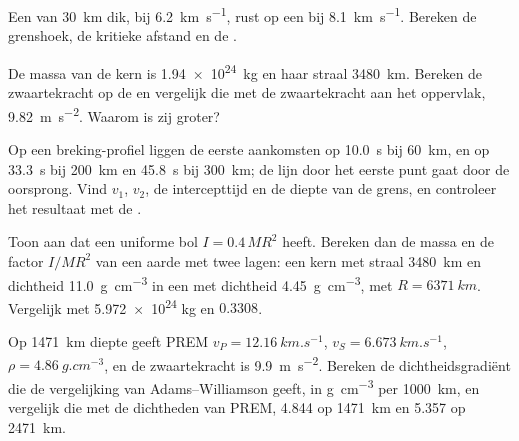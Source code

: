 \begin{exercise}[$\star$]\label{exo:b1:layered-earth:3}
Een  van \qty{30}{km} dik, bij \qty{6.2}{km.s^{-1}}, rust op een  bij \qty{8.1}{km.s^{-1}}. Bereken de grenshoek, de kritieke afstand en de .
\end{exercise}

\begin{exercise}[$\star$]\label{exo:b1:layered-earth:4}
De massa van de kern is \qty{1.94e24}{kg} en haar straal \qty{3480}{km}. Bereken de zwaartekracht op de  en vergelijk die met de
zwaartekracht aan het oppervlak, \qty{9.82}{m.s^{-2}}. Waarom is zij groter?
\end{exercise}

\begin{exercise}[$\star\star$]\label{exo:b1:layered-earth:5}
Op een breking-profiel liggen de eerste aankomsten op \qty{10.0}{s} bij \qty{60}{km}, en op \qty{33.3}{s} bij \qty{200}{km} en \qty{45.8}{s} bij
\qty{300}{km}; de lijn door het eerste punt gaat door de oorsprong. Vind $v_1$, $v_2$, de intercepttijd en de diepte van de grens, en controleer het
resultaat met de .
\end{exercise}

\begin{exercise}[$\star\star$]\label{exo:b1:layered-earth:6}
Toon aan dat een uniforme bol $I = 0.4\,MR^2$ heeft. Bereken dan de massa en de factor $I/MR^2$ van een aarde met twee lagen: een kern met straal
\qty{3480}{km} en dichtheid \qty{11.0}{g.cm^{-3}} in een  met dichtheid \qty{4.45}{g.cm^{-3}}, met $R = \qty{6371}{km}$. Vergelijk met \num{5.972e24} kg en $0.3308$.
\end{exercise}

\begin{exercise}[$\star\star$]\label{exo:b1:layered-earth:7}
Op \qty{1471}{km} diepte geeft PREM $v_P = \qty{12.16}{km.s^{-1}}$, $v_S = \qty{6.673}{km.s^{-1}}$, $\rho = \qty{4.86}{g.cm^{-3}}$, en de zwaartekracht
is \qty{9.9}{m.s^{-2}}. Bereken de dichtheidsgradiënt die de vergelijking van Adams--Williamson geeft, in \unit{g.cm^{-3}} per \qty{1000}{km}, en vergelijk
die met de dichtheden van PREM, \num{4.844} op \qty{1471}{km} en \num{5.357} op \qty{2471}{km}.
\end{exercise}

